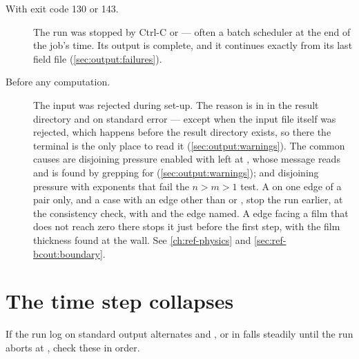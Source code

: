 \begin{description}
  \item[With exit code 130 or 143.] The run was stopped by Ctrl-C or
     --- often a batch scheduler at the end of the job's time.
    Its output is complete, and it continues exactly from its last field file
    (\cref{sec:output:failures}).

  \item[Before any computation.] The input was rejected during set-up. The
    reason is in  in the result directory and on
    standard error --- except when the input file itself was rejected, which
    happens before the result directory exists, so there the terminal is the
    only place to read it (\cref{sec:output:warnings}). The
    common causes are disjoining pressure enabled with
     left at , whose
    message reads  and is found by grepping
    for  (\cref{sec:output:warnings}); and
    disjoining pressure with exponents that fail the $n > m > 1$ test. A
     on one edge of a pair only, and a  case with an
    edge other than  or , stop the run earlier,
    at the consistency check, with  and the edge named. A
     edge facing a film that does not reach zero there stops it
    just before the first step, with the film thickness found at the wall. See
    \cref{ch:ref-physics} and \cref{sec:ref-bcout:boundary}.
\end{description}

\section{The time step collapses}
\label{sec:trouble:dt}

If the run log on standard output alternates  and , or
 in  falls steadily until the run aborts at
, check these in order.

